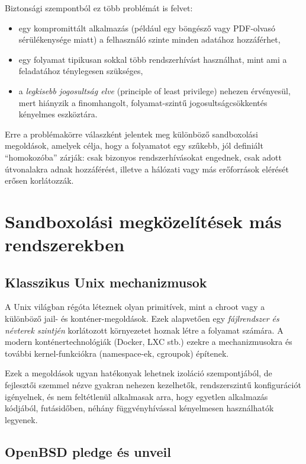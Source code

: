 Biztonsági szempontból ez több problémát is felvet:

\begin{itemize}
  \item egy kompromittált alkalmazás (például egy böngésző vagy PDF-olvasó
        sérülékenysége miatt) a felhasználó szinte minden adatához hozzáférhet,
  \item egy folyamat tipikusan sokkal több rendszerhívást használhat, mint ami
        a feladatához ténylegesen szükséges,
  \item a \emph{legkisebb jogosultság elve} (principle of least privilege)
        nehezen érvényesül, mert hiányzik a finomhangolt, folyamat-szintű
        jogosultságcsökkentés kényelmes eszköztára.
\end{itemize}

Erre a problémakörre válaszként jelentek meg különböző sandboxolási
megoldások, amelyek célja, hogy a folyamatot egy szűkebb, jól definiált
``homokozóba'' zárják: csak bizonyos rendszerhívásokat engednek, csak adott
útvonalakra adnak hozzáférést, illetve a hálózati vagy más erőforrások
elérését erősen korlátozzák.


\section{Sandboxolási megközelítések más rendszerekben}

\subsection{Klasszikus Unix mechanizmusok}

A Unix világban régóta léteznek olyan primitívek, mint a chroot
\cite{linux_chroot_2} vagy
a különböző jail- és konténer-megoldások. Ezek alapvetően egy \emph{fájlrendszer
és névterek szintjén} korlátozott környezetet hoznak létre a folyamat számára.
A modern konténertechnológiák (Docker, LXC stb.) ezekre a mechanizmusokra és
további kernel-funkciókra (namespace-ek, cgroupok) építenek.
\cite{docker_engine_security} \cite{lxc_introduction}

Ezek a megoldások ugyan hatékonyak lehetnek izoláció szempontjából, de
fejlesztői szemmel nézve gyakran nehezen kezelhetők, rendszerszintű
konfigurációt igényelnek, és nem feltétlenül alkalmasak arra, hogy egyetlen
alkalmazás kódjából, futásidőben, néhány függvényhívással kényelmesen
használhatók legyenek.


\subsection{OpenBSD pledge és unveil}

